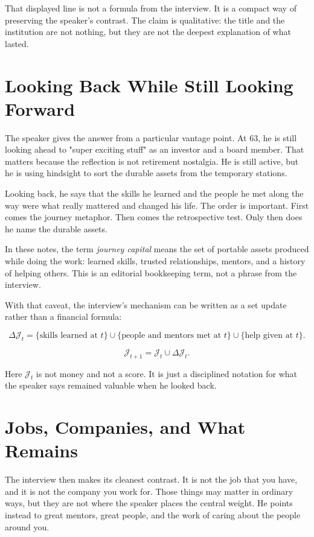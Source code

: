That displayed line is not a formula from the interview. It is a compact way of preserving the speaker's contrast. The claim is qualitative: the title and the institution are not nothing, but they are not the deepest explanation of what lasted.

\section{Looking Back While Still Looking Forward}

The speaker gives the answer from a particular vantage point. At 63, he is still looking ahead to "super exciting stuff" as an investor and a board member. That matters because the reflection is not retirement nostalgia. He is still active, but he is using hindsight to sort the durable assets from the temporary stations.

Looking back, he says that the skills he learned and the people he met along the way were what really mattered and changed his life. The order is important. First comes the journey metaphor. Then comes the retrospective test. Only then does he name the durable assets.

\begin{definition}
In these notes, the term \emph{journey capital} means the set of portable assets produced while doing the work: learned skills, trusted relationships, mentors, and a history of helping others. This is an editorial bookkeeping term, not a phrase from the interview.
\end{definition}

With that caveat, the interview's mechanism can be written as a set update rather than a financial formula:

\[
\Delta \mathcal{J}_t
=
\{\text{skills learned at }t\}
\cup
\{\text{people and mentors met at }t\}
\cup
\{\text{help given at }t\}.
\]

\[
\mathcal{J}_{t+1}
=
\mathcal{J}_t \cup \Delta \mathcal{J}_t.
\]

Here \(\mathcal{J}_t\) is not money and not a score. It is just a disciplined notation for what the speaker says remained valuable when he looked back.

\section{Jobs, Companies, and What Remains}

The interview then makes its cleanest contrast. It is not the job that you have, and it is not the company you work for. Those things may matter in ordinary ways, but they are not where the speaker places the central weight. He points instead to great mentors, great people, and the work of caring about the people around you.


